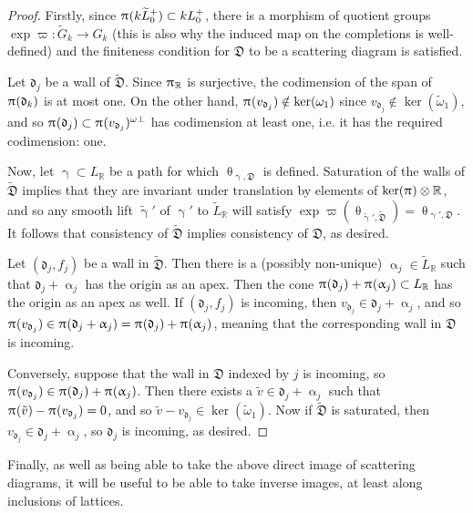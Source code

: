 \documentclass{amsart}
\let\bb=\mathbb
\let\f=\mathfrak
\let\wt=\widetilde
\renewcommand{\theta}{\uptheta}
\renewcommand{\alpha}{\upalpha}
\renewcommand{\gamma}{\upgamma}
\renewcommand{\pi}{\uppi\hspace{0.05em}}
\theoremstyle{plain}%
\theoremstyle{definition}
\theoremstyle{remark}
\begin{document}
\begin{proof}
Firstly, since $\pi(k\wt{L}_0^+)\subset kL_0^+$, there is a morphism of quotient groups $\exp\varpi\colon\wt{G}_k\rightarrow G_k$ (this is also why the induced map on the completions is well-defined) and the finiteness condition for $\f{D}$ to be a scattering diagram is satisfied.  

Let $\f{d}_j$ be a wall of $\wt{\f{D}}$.  Since $\pi_{\bb{R}}$ is surjective, the codimension of the span of $\pi(\f{d}_k)$ is at most one.  On the other hand, $\pi(v_{\f{d}_j})\notin \ker(\omega_1)$ since $v_{\f{d}_j}\notin\ker(\wt{\omega}_1)$, and so $\pi(\f{d}_j)\subset \pi(v_{\f{d}_j})^{\omega\perp}$ has codimension at least one, i.e. it has the required codimension: one.  


Now, let $\gamma\subset L_{\bb{R}}$ be a path for which $\theta_{\gamma,\f{D}}$ is defined.  Saturation of the walls of $\wt{\f{D}}$ implies that they are invariant under translation by elements of $\ker(\pi)\otimes \bb{R}$, and so any smooth lift $\wt{\gamma}'$ of $\gamma'$ to $\wt{L}_{\bb{R}}$ will satisfy $\exp \varpi(\theta_{\wt{\gamma}',\wt{\f{D}}})=\theta_{\gamma',\f{D}}$.  It follows that consistency of $\wt{\f{D}}$ implies consistency of $\f{D}$, as desired.


Let $(\f{d}_j,f_j)$ be a wall in $\wt{\f{D}}$.  Then there is a (possibly non-unique) $\alpha_j\in \wt{L}_{\bb{R}}$ such that $\f{d}_j+\alpha_j$ has the origin as an apex.  Then the cone $\pi(\f{d}_j)+\pi(\alpha_j) \subset L_{\bb{R}}$ has the origin as an apex as well.  If $(\f{d}_j,f_j)$ is incoming, then $v_{\f{d}_j}\in \f{d}_j+\alpha_j$, and so $\pi(v_{\f{d}_j})\in \pi(\f{d}_j + \alpha_j) =  \pi(\f{d}_j)+\pi(\alpha_j)$, meaning that the corresponding wall in $\f{D}$ is incoming.

Conversely, suppose that the wall in $\f{D}$ indexed by $j$ is incoming, so $\pi(v_{\f{d}_j})\in \pi(\f{d}_j)+\pi(\alpha_j)$. Then there exists a $\tilde{v}\in \f{d}_j+\alpha_j$ such that $\pi(\tilde{v})-\pi(v_{\f{d}_j})=0$, and so $\tilde{v}-v_{\f{d}_j}\in \ker(\wt{\omega}_1)$.  Now if $\wt{\f{D}}$ is saturated, then $v_{\f{d}_j}\in\f{d}_j+\alpha_j$, so $\f{d}_j$ is incoming, as desired.
\end{proof}
Finally, as well as being able to take the above direct image of scattering diagrams, it will be useful to be able to take inverse images, at least along inclusions of lattices.
\end{document}
